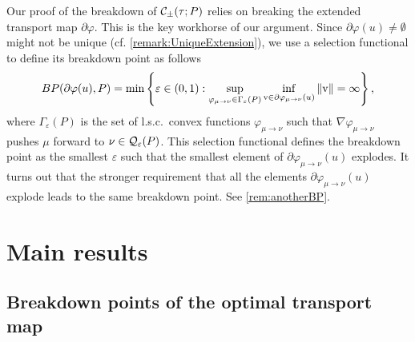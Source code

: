 \documentclass[11pt]{article}
\newcommand{\eps}{\varepsilon}
\theoremstyle{plain}
\theoremstyle{definition}
\begin{document}
Our proof of the breakdown of ${\cal  C}_\pm(\tau;P )$ relies on breaking the extended transport map  $\partial \varphi$.  This is the key workhorse of our argument. Since $\partial \varphi(u)\neq \emptyset$ might not be unique (cf. \autoref{remark:UniqueExtension}), we use a selection functional to define its breakdown point as follows 
%
$${\rm BP}(\partial \varphi(u), P)= \min \left\{ \eps\in (0,1): \sup_{\varphi_{\mu\to \nu}\in \Gamma_\eps(P)} \inf_{\mathrm{v}\in \partial \varphi_{\mu\to \nu} (u)} \|\mathrm{v}\| = \infty\right \},
$$
where $\Gamma_\eps(P)$ is the set of l.s.c.\ convex functions $\varphi_{\mu\to \nu}$ such that $\nabla \varphi_{\mu\to \nu}$ pushes $\mu$ forward to  $\nu\in {\cal Q}_\eps(P)$. This selection functional defines the breakdown point as the smallest $\varepsilon$ such that  the smallest element of $\partial\varphi_{\mu\to\nu}(u)$ explodes.
%
It turns out that the stronger requirement that all the elements $\partial\varphi_{\mu\to\nu}(u)$ explode leads to the same breakdown point. See \autoref{rem:anotherBP}.

\section{Main results}\label{Sec:MainResultsCont}

\subsection{Breakdown points of the optimal transport map}
\end{document}
